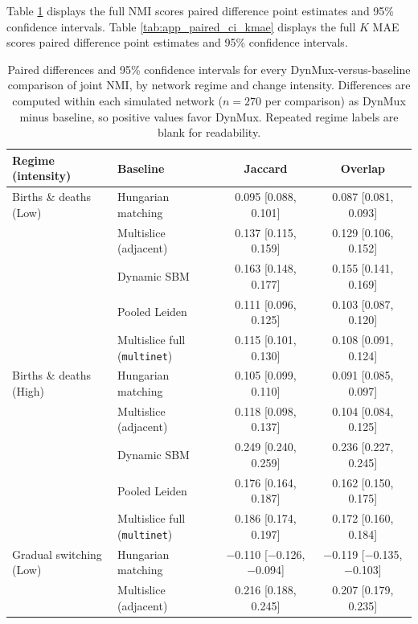 \documentclass[11pt, letterpaper]{article}
\numberwithin{equation}{section}
\begin{document}
Table \ref{tab:app_paired_ci_nmi} displays the full NMI scores paired difference point estimates and 95\% confidence intervals. Table \ref{tab:app_paired_ci_kmae} displays the full $K$ MAE scores paired difference point estimates and 95\% confidence intervals. 
\begin{table}[htbp]
\centering
\singlespacing
\scriptsize
\setlength{\tabcolsep}{4pt}
\caption{Paired differences and 95\% confidence intervals for every
DynMux-versus-baseline comparison of joint NMI, by network regime and change
intensity. Differences are computed within each simulated network
($n = 270$ per comparison) as DynMux minus baseline, so positive values
favor DynMux. Repeated regime labels are blank for readability.}
\label{tab:app_paired_ci_nmi}
\begin{tabular}{llcc}
\toprule
Regime (intensity) & Baseline & Jaccard & Overlap \\
\midrule
Births \& deaths (Low) & Hungarian matching & 0.095 [0.088, 0.101] & 0.087 [0.081, 0.093] \\
 & Multislice (adjacent) & 0.137 [0.115, 0.159] & 0.129 [0.106, 0.152] \\
 & Dynamic SBM & 0.163 [0.148, 0.177] & 0.155 [0.141, 0.169] \\
 & Pooled Leiden & 0.111 [0.096, 0.125] & 0.103 [0.087, 0.120] \\
 & Multislice full (\texttt{multinet}) & 0.115 [0.101, 0.130] & 0.108 [0.091, 0.124] \\
Births \& deaths (High) & Hungarian matching & 0.105 [0.099, 0.110] & 0.091 [0.085, 0.097] \\
 & Multislice (adjacent) & 0.118 [0.098, 0.137] & 0.104 [0.084, 0.125] \\
 & Dynamic SBM & 0.249 [0.240, 0.259] & 0.236 [0.227, 0.245] \\
 & Pooled Leiden & 0.176 [0.164, 0.187] & 0.162 [0.150, 0.175] \\
 & Multislice full (\texttt{multinet}) & 0.186 [0.174, 0.197] & 0.172 [0.160, 0.184] \\
Gradual switching (Low) & Hungarian matching & $-$0.110 [$-$0.126, $-$0.094] & $-$0.119 [$-$0.135, $-$0.103] \\
 & Multislice (adjacent) & 0.216 [0.188, 0.245] & 0.207 [0.179, 0.235] \\

\end{tabular}
\end{table}
\end{document}
